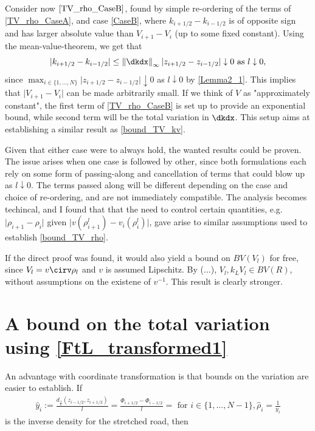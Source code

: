 Consider now $\eqref{TV_rho_CaseB}$, found by simple re-ordering of the terms of \eqref{TV_rho_CaseA}, and case \eqref{CaseB}, where $k_{i+1/2} - k_{i-1/2}$ is of opposite sign and has larger absolute value than $V_{i+1} - V_{i}$ (up to some fixed constant). Using the mean-value-theorem, we get that 
\begin{equation}
    \vert k_{i+1/2} - k_{i-1/2} \vert \leq \norm{\dkdx}_\infty \vert z_{i+1/2} - z_{i-1/2}\vert \downarrow 0 \text{ as } l\downarrow0,
\end{equation}
since $\max_{i \in \{1,...,N\}}\lvert z_{i+1/2} - z_{i-1/2} \vert \downarrow 0$ as $l \downarrow 0$ by \eqref{Lemma2_1}. This implies that $\vert V_{i+1} - V_{i}\vert $ can be made arbitrarily small. If we think of $V$ as "approximately constant", the first term of \eqref{TV_rho_CaseB} is set up to provide an exponential bound, while second term will be  the total variation in $\dkdx$. This setup aims at establishing a similar result as \eqref{bound_TV_kv}. 

Given that either case were to always hold, the wanted results could be proven. The issue arises when one case is followed by other, since both formulations each rely on some form of passing-along and cancellation of terms that could blow up as $l\downarrow 0$. The terms passed along will be different depending on the case and choice of re-ordering, and are not immediately compatible. The analysis becomes techincal, and I found that that the need to control certain quantities, e.g.  $\vert \rho_{i+1} - \rho_{i}\vert$ given $\vert v(\rho^l_{i+1}) - v_i(\rho^l_i) \vert$, gave arise to similar assumptions used to establish \eqref{bound_TV_rho}. 

If the direct proof was found, it would also yield a bound on $BV(V_l)$ for free, since $V_l = v \cirv \rho_l$ and $v$ is assumed Lipschitz. By (...), $V_l, k_L V_l \in BV(R)$, without assumptions on the existene of $v^{-1}$. This result is clearly stronger. 

\fi
\iffalse
\section{A bound on the total variation using \eqref{FtL_transformed1}}

An advantage with coordinate transformation \label{section:Phi} is that bounds on the variation are easier to establish. 
If 
\begin{align}
	\hat{y}_i := \frac{d_{\frac{1}{k}}(z_{i-1/2}, z_{i+1/2})}{l} = \frac{\Phi_{i+1/2} - \Phi_{i-1/2}}{l} =  \text{ for } i \in \{1,...,N-1\}, 
	\hat{\rho}_i = \frac{1}{y_i}
\end{align}
is the inverse density for the stretched road, then 
 
